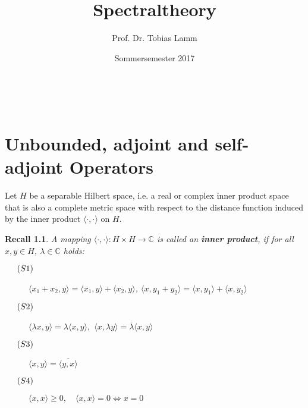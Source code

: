 \documentclass[12pt]{extreport} %
\title{Spectraltheory}
\author{Prof. Dr. Tobias Lamm}
\date{Sommersemester 2017}
\makeatletter
\newcommand{\C}{\mathbb{C}}
\theoremstyle{named}
\theoremstyle{nnamed}
\theoremstyle{itshape}
\theoremstyle{normal}
\newtheorem*{recall}{Recall}
\def\maketitle{ \begin{titlepage} 
			~\vspace{3cm} 
		\begin{center} {\Huge \@title} \end{center} 
	 		\vspace*{1cm} 
	 	\begin{center} {\large \@author} \end{center} 
	 	\vspace*{-0.5cm}
	 	\begin{center} \@date \end{center} 
	 		\vspace*{7cm} 
	 	\begin{center} \@publishers \end{center} 
	 		\vfill 
	\end{titlepage} }
\makeatother
\begin{document}
\begin{titlepage}
	\maketitle
	\thispagestyle{empty}
\end{titlepage}

\tableofcontents
\thispagestyle{empty}


\chapter{Unbounded, adjoint and self-adjoint Operators}


Let $H$ be a separable Hilbert space, i.e. a real or complex inner product space that is also a complete metric space with respect to the distance function induced by the inner product $\langle \cdot, \cdot \rangle$ on $H$. ~\bigskip

\begin{recall} 
	A mapping $\langle \cdot, \cdot \rangle \colon H \times H \rightarrow \C$
	is called an \textbf{inner product}, if for all $x, y \in H$, $\lambda \in \C$ holds:
	\begin{description}
	 	\item[$\hspace{0.5cm} (S1) \hspace{0.1cm} $] $\langle x_{1} + x_{2}, y \rangle = \langle x_{1}, y \rangle + \langle x_{2}, y \rangle$, $\langle x, y_{1} + y_{2} \rangle = \langle x, y_{1} \rangle + \langle x, y_{2} \rangle$
	 	\item[$\hspace{0.5cm} (S2) \hspace{0.1cm} $] $\langle  \lambda x, y \rangle = \lambda \langle x, y \rangle,$ $\langle x, \lambda y \rangle = \overline{\lambda} \langle x, y \rangle$
	 	\item[$\hspace{0.5cm} (S3) \hspace{0.1cm} $] $\langle  x, y \rangle = \overline{\langle y, x \rangle }$
	 	\item[$\hspace{0.5cm} (S4) \hspace{0.1cm} $] $\langle  x, x \rangle \geq 0, \quad \langle x, x \rangle = 0 \iff x = 0$
	\end{description}	
\end{recall} ~\smallskip
\end{document}

